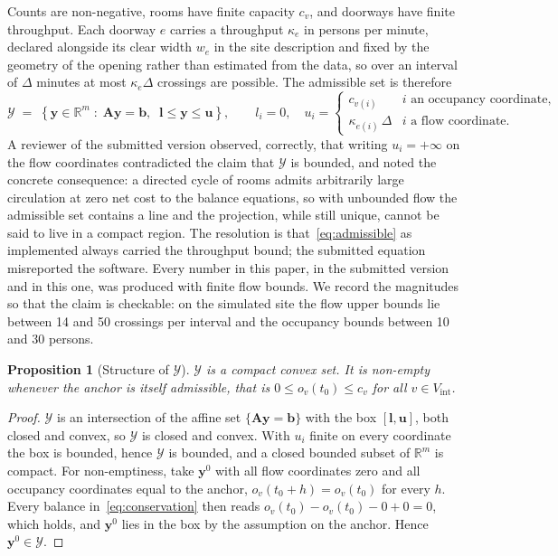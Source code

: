\documentclass[11pt]{article}
\theoremstyle{plain}
\newtheorem{proposition}[theorem]{Proposition}
\theoremstyle{definition}
\theoremstyle{remark}
\newcommand{\bA}{\bm{A}}
\newcommand{\by}{\bm{y}}
\newcommand{\bb}{\bm{b}}
\newcommand{\cY}{\mathcal{Y}}
\newcommand{\Rb}{\mathbb{R}}
\newif\ifrevisionmarkup
\newcommand{\new}[1]{\ifrevisionmarkup\textcolor{revision}{#1}\else#1\fi}
\begin{document}
Counts are non-negative, rooms have finite capacity $c_v$, \new{and doorways have finite throughput}. \new{Each doorway $e$ carries a throughput $\kappa_e$ in persons per minute, declared alongside its clear width $w_e$ in the site description and fixed by the geometry of the opening rather than estimated from the data, so over an interval of $\Delta$ minutes at most $\kappa_e \Delta$ crossings are possible.} The admissible set is therefore
\begin{equation}
\cY \;=\; \left\{ \by \in \Rb^m \;:\; \bA\by = \bb, \;\; \bm{l} \le \by \le \bm{u} \right\},
\qquad
l_i = 0, \quad
u_i = \begin{cases} c_{v(i)} & \text{$i$ an occupancy coordinate},\\ \new{\kappa_{e(i)}\,\Delta} & \text{$i$ a flow coordinate}.\end{cases}
\label{eq:admissible}
\end{equation}
\new{A reviewer of the submitted version observed, correctly, that writing $u_i = +\infty$ on the flow coordinates contradicted the claim that $\cY$ is bounded, and noted the concrete consequence: a directed cycle of rooms admits arbitrarily large circulation at zero net cost to the balance equations, so with unbounded flow the admissible set contains a line and the projection, while still unique, cannot be said to live in a compact region. The resolution is that~\eqref{eq:admissible} as implemented always carried the throughput bound; the submitted equation misreported the software. Every number in this paper, in the submitted version and in this one, was produced with finite flow bounds. We record the magnitudes so that the claim is checkable: on the simulated site the flow upper bounds lie between \num{14} and \num{50} crossings per interval and the occupancy bounds between \num{10} and \num{30} persons.}

\begin{proposition}[Structure of $\cY$]
\label{prop:convex}
$\cY$ is a \new{compact} convex set. It is non-empty whenever the anchor is itself admissible, that is $0 \le o_v(t_0) \le c_v$ for all $v \in V_{\mathrm{int}}$.
\end{proposition}
\begin{proof}
$\cY$ is an intersection of the affine set $\{\bA\by = \bb\}$ with the box $[\bm{l},\bm{u}]$, both closed and convex, so $\cY$ is closed and convex. \new{With $u_i$ finite on every coordinate the box is bounded, hence $\cY$ is bounded, and a closed bounded subset of $\Rb^m$ is compact.} For non-emptiness, take $\by^{0}$ with all flow coordinates zero and all occupancy coordinates equal to the anchor, $o_v(t_0+h) = o_v(t_0)$ for every $h$. Every balance in~\eqref{eq:conservation} then reads $o_v(t_0)-o_v(t_0)-0+0=0$, which holds, and $\by^{0}$ lies in the box by the assumption on the anchor. Hence $\by^{0} \in \cY$.
\end{proof}
\end{document}
